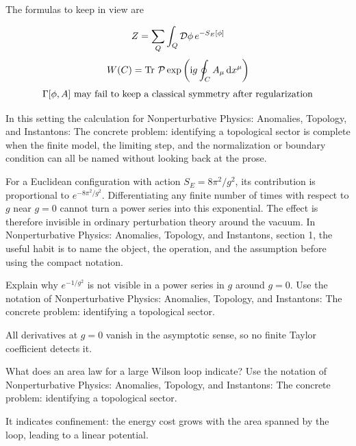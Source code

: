 The formulas to keep in view are

\[
  Z=\sum_Q\int_Q\mathcal D\phi\,e^{-S_E[\phi]}
\]
\[
  W(C)=\operatorname{Tr}\,\mathcal P\exp\left(\mathrm i g\oint_C A_\mu\,\mathrm d x^\mu\right)
\]
\[
  \Gamma[\phi,A]\hbox{ may fail to keep a classical symmetry after regularization}
\]

In this setting the calculation for Nonperturbative Physics: Anomalies, Topology, and Instantons: The concrete problem: identifying a topological sector is complete when the finite model, the limiting step, and the normalization or boundary condition can all be named without looking back at the prose.




\begin{example}
For a Euclidean configuration with action \(S_E=8\pi^2/g^2\), its contribution is proportional to \(e^{-8\pi^2/g^2}\).  Differentiating any finite number of times with respect to \(g\) near \(g=0\) cannot turn a power series into this exponential.  The effect is therefore invisible in ordinary perturbation theory around the vacuum.  In Nonperturbative Physics: Anomalies, Topology, and Instantons, section 1, the useful habit is to name the object, the operation, and the assumption before using the compact notation.
\end{example}



\begin{exercise}
Explain why \(e^{-1/g^2}\) is not visible in a power series in \(g\) around \(g=0\).  Use the notation of Nonperturbative Physics: Anomalies, Topology, and Instantons: The concrete problem: identifying a topological sector.
\begin{answer}
All derivatives at \(g=0\) vanish in the asymptotic sense, so no finite Taylor coefficient detects it.
\end{answer}
\end{exercise}

\begin{exercise}
What does an area law for a large Wilson loop indicate?  Use the notation of Nonperturbative Physics: Anomalies, Topology, and Instantons: The concrete problem: identifying a topological sector.
\begin{answer}
It indicates confinement: the energy cost grows with the area spanned by the loop, leading to a linear potential.
\end{answer}
\end{exercise}



